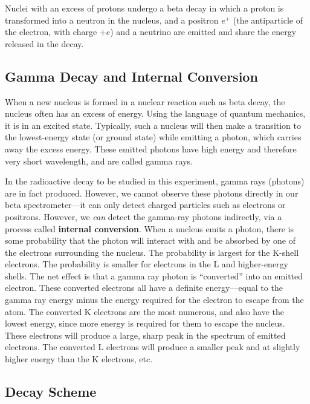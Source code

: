 Nuclei with an excess of protons undergo a beta decay in which a
proton is transformed into a neutron in the nucleus, and a positron
$e^+$ (the antiparticle of the
electron, with charge $+e$) and a neutrino are emitted and share the
energy released in the decay.


\subsection{Gamma Decay and Internal Conversion}


When a new nucleus is formed in a nuclear reaction such as beta decay,
the nucleus often has an excess of energy.  Using the language of
quantum mechanics, it is in an excited state.  Typically, such a
nucleus will then make a transition to the lowest-energy state  (or
ground state) while emitting a photon, which carries away the excess
energy.  These emitted photons have high energy and therefore very
short wavelength, and are called gamma rays.


In the radioactive decay to be studied in this experiment, gamma rays (photons)
are in fact produced.  However, we cannot observe these photons directly in our
beta spectrometer---it can only detect charged particles such as electrons or
positrons.  However, we {\em can} detect the gamma-ray photons indirectly, via a
process called {\bf internal conversion}.  When a nucleus emits a photon, there
is some probability that the photon will interact with and be absorbed by one of
the electrons surrounding the nucleus.  The probability is largest for the
K-shell electrons.  The probability is smaller for
electrons in the L and higher-energy shells.  The net effect is that a gamma ray
photon is ``converted'' into an emitted electron.  These converted electrons all
have a definite energy---equal to the gamma ray energy minus the energy required
for the electron to escape from the atom.  The converted K electrons are the
most numerous, and also have the lowest energy, since more energy is required
for them to escape the nucleus.  These electrons will produce a large, sharp
peak in the spectrum of emitted electrons.  The converted L electrons will
produce a smaller peak and at slightly higher energy than the K electrons, etc.


\subsection{\cs Decay Scheme}


